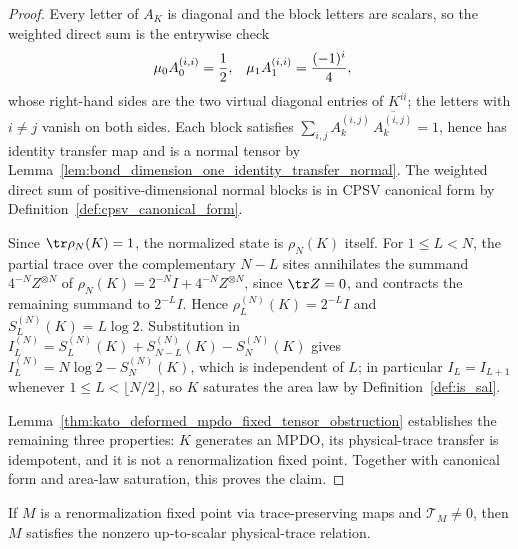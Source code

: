 \begin{proof}
    \leanok
    Every letter of $A_K$ is diagonal and the block letters are scalars, so
    the weighted direct sum is the entrywise check
    \begin{align}
        \mu_0A_0^{(i,i)} & =\frac12,        &
        \mu_1A_1^{(i,i)} & =\frac{(-1)^i}4,
        \notag
    \end{align}
    whose right-hand sides are the two virtual diagonal entries of $K^{ii}$;
    the letters with $i\ne j$ vanish on both sides. Each block satisfies
    $\sum_{i,j}A_k^{(i,j)}\,\overline{A_k^{(i,j)}}=1$, hence has identity
    transfer map and is a normal tensor by
    Lemma~\ref{lem:bond_dimension_one_identity_transfer_normal}. The
    weighted direct sum of positive-dimensional normal blocks is in
    CPSV canonical form by Definition~\ref{def:cpsv_canonical_form}.

    Since $\tr\rho_N(K)=1$, the normalized state is $\rho_N(K)$ itself.
    For $1\leq L<N$, the partial trace over the complementary $N-L$ sites
    annihilates the summand $4^{-N}Z^{\otimes N}$ of
    $\rho_N(K)=2^{-N}I+4^{-N}Z^{\otimes N}$, since $\tr Z=0$, and
    contracts the remaining summand to $2^{-L}I$. Hence
    $\rho_L^{(N)}(K)=2^{-L}I$ and $S_L^{(N)}(K)=L\log2$. Substitution in
    $I_L^{(N)}=S_L^{(N)}(K)+S_{N-L}^{(N)}(K)-S_N^{(N)}(K)$ gives
    $I_L^{(N)}=N\log2-S_N^{(N)}(K)$, which is independent of
    $L$; in particular $I_L=I_{L+1}$ whenever
    $1\leq L<\lfloor N/2\rfloor$, so $K$ saturates the area law by
    Definition~\ref{def:is_sal}.

    Lemma~\ref{thm:kato_deformed_mpdo_fixed_tensor_obstruction} establishes
    the remaining three properties: $K$ generates an MPDO, its
    physical-trace transfer is idempotent, and it is not a renormalization
    fixed point. Together with canonical form and area-law saturation, this
    proves the claim.
\end{proof}

\begin{corollary}
    \label{thm:rfp_via_ts_source_zcl}
    \leanok
    If $M$ is a renormalization fixed point via trace-preserving maps and
    $\mathcal T_M\ne0$, then $M$ satisfies the nonzero up-to-scalar
    physical-trace relation.
\end{corollary}

